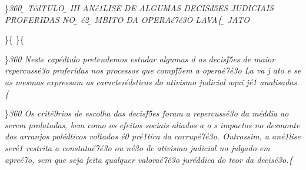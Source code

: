 \par 

\}\pard \ltrpar\qj {}\sl360\widctlpar\wrapdefault\faauto{} {\rtlch{} \ab{} \ltrch{} \b{} T\'cdTULO}{\rtlch{} \ab{} \ltrch{} 
\b{}  III \endash  AN\'c1LISE DE ALGUMAS DECIS\'d5ES JUDICIAIS PROFERIDAS NO }{\rtlch{} \ab{} \ltrch{} \b{} \'c2}{\rtlch{} \ab{} \ltrch{} 
\b{} MBITO DA OPERA\'c7\'c3O LAVA}\{\rtlch{}
\ab{} \ltrch{} \b{} JATO
\par \}\{\rtlch{}  \ltrch{} 
\tab \}\{\rtlch{}  \ltrch{} 
\par \}\pard \ltrpar\qj {}\sl360\widctlpar\wrapdefault\faauto{} {\rtlch{}  \ltrch{}  Neste cap\'edtulo pretendemos estudar }{\rtlch{}  \ltrch{} 
 algumas d}{\rtlch{}  \ltrch{}  as decis\'f5es de maior repercuss\'e3o proferidas nos processos que comp\'f5em a opera\'e7\'e3o La}{\rtlch{}  \ltrch{}  va}{\rtlch{}  
\ltrch{}  j}{\rtlch{}  \ltrch{}  ato e se as mesmas expressam as caracter\'edsticas do ativismo judicial aqui j\'e1 analisadas.}{\rtlch{}  \ltrch{}   }\{\rtlch{}
 \ltrch{} \\
\par \}\pard \ltrpar\qj {}\sl360\widctlpar\wrapdefault\faauto{} {\rtlch{}  \ltrch{}  \tab Os crit\'e9rios de escolha das decis\'f5es foram }{\rtlch{}  \ltrch{} 
 a}{\rtlch{}  \ltrch{}   repercuss\'e3o da m\'eddia ao serem prolatadas, bem como os efeitos sociais }{\rtlch{}  \ltrch{}  aliados a}{\rtlch{}  \ltrch{} 
 o}{\rtlch{}  \ltrch{}  s impactos no}{\rtlch{}  \ltrch{}   desmonte dos arranjos pol\'edticos voltados \'e0 pr\'e1tica da corrup\'e7\'e3o. Outrossim, a an\'e1lise ser\'e1
 restrita a constata\'e7\'e3o ou n\'e3o de ativismo judicial no julgado em apre\'e7o, sem que seja feita qualquer valora\'e7\'e3o jur\'eddica do teor da decis\'e3o.}\{\rtlch{}
